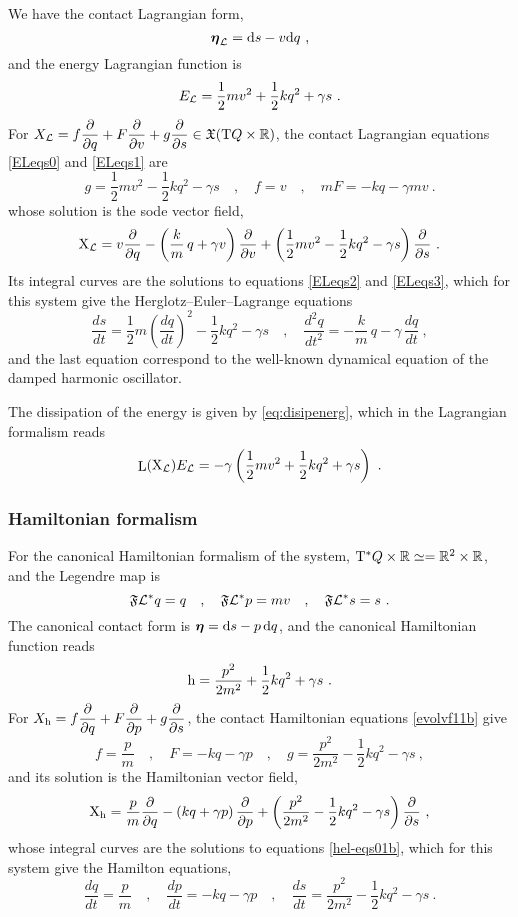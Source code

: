 \documentclass[12pt]{report}
\def\beq{\begin{equation}}
\def\eeq{\end{equation}}
\def\dst{\displaystyle}
\def\derpar#1#2{\frac{\partial{#1}}{\partial{#2}}}
\def\vf{\mathfrak X}
\def\Lag{{\cal L}}
\def\d{{\rm d}}
\def\Real{\mathbb{R}}
\def\bmeta{\mbox{\boldmath $\eta$}}
\def\X{{\rm X}}
\def\Tan{{\rm T}}
\def\Lie{\mathop{\rm L}\nolimits}
\begin{document}
We have the contact Lagrangian form,
$$
\bmeta_\Lag=\d s-v\d q \ ,
$$
and the energy Lagrangian function is
$$ 
E_\Lag = \frac{1}{2}mv^2 + \frac{1}{2}kq^2 + \gamma s \ .
$$
For $\displaystyle X_\Lag=f\derpar{}{q}+F\derpar{}{v}+g\derpar{}{s}\in\vf(\Tan Q\times\Real)$,
the contact Lagrangian equations \eqref{ELeqs0}
and \eqref{ELeqs1} are
$$
g=\frac{1}{2}mv^{2}-\frac{1}{2}kq^{2}-\gamma s \quad , \quad f=v \quad , \quad mF=-kq-\gamma mv \ .
$$
whose solution is the {\sc sode} vector field,
$$
\X_\Lag=v\frac{\partial}{\partial q}-
\left(\frac{k}{m}\,q+\gamma v\right) \frac{\partial}{\partial v}+\left(\frac{1}{2}mv^{2}-\frac{1}{2}kq^{2}-\gamma s\right)\frac{\partial}{\partial s}\ .
$$
Its integral curves are the solutions to equations \eqref{ELeqs2} and \eqref{ELeqs3},
which for this system give the Herglotz--Euler--Lagrange equations
\beq
\label{HELdho}
\frac{ds}{dt}=\frac{1}{2}m\left(\frac{dq}{dt}\right)^2-\frac{1}{2}kq^{2}-\gamma s \quad , \quad
\frac{d^2q}{dt^2}=-\frac{k}{m}\,q-\gamma\,\frac{dq}{dt} \ ,
\eeq
and the last equation correspond to the well-known dynamical equation of the damped harmonic oscillator. 

The dissipation of the energy is given by 
\eqref{eq:disipenerg}, which in the Lagrangian formalism reads
$$
\Lie(\X_\Lag)E_\Lag=-\gamma\left(\frac{1}{2}mv^2 + \frac{1}{2}kq^2 + \gamma s\right)\ .
$$


\subsubsection{Hamiltonian formalism}


For the canonical Hamiltonian formalism of the system, 
$\Tan^*Q\times\Real\simeq=\Real^2\times\Real$,
and the Legendre map is 
$$
\mathfrak{F}\Lag^*q=q  \quad , \quad \mathfrak{F}\Lag^*p=mv  \quad , \quad \mathfrak{F}\Lag^*s=s  \ .
$$
The canonical contact form is $\bmeta=\d s-p\,\d q$, and 
the canonical Hamiltonian function reads
$$ 
{\rm h}=\frac{p^2}{2m^2} + \frac{1}{2}kq^2 + \gamma s \ .
$$
For $\displaystyle X_{\rm h}=f\derpar{}{q}+F\derpar{}{p}+g\derpar{}{s}$,
the contact Hamiltonian equations \eqref{evolvf11b} give
$$
f=\frac{p}{m} \quad , \quad F=-kq-\gamma p \quad , \quad g=\frac{p^2}{2m^2}-\frac{1}{2}kq^2-\gamma s  \ ,
$$
and its solution is the Hamiltonian vector field,
$$
\X_{\rm h}=\frac{p}{m}\frac{\partial}{\partial q}-
\left(kq+\gamma p\right) \frac{\partial}{\partial p}+\left(\frac{p^2}{2m^2}-\frac{1}{2}kq^2-\gamma s\right)\frac{\partial}{\partial s}\ ,
$$
whose integral curves are the solutions to equations \eqref{hel-eqs01b},
which for this system give the Hamilton equations,
\beq
\label{Hdho}
\dst\frac{dq}{dt}=\frac{p}{m}\quad ,\quad
\dst\frac{dp}{dt}=-kq-\gamma p\quad , \quad
\dst\frac{ds}{dt}=\frac{p^2}{2m^2}-\frac{1}{2}kq^2-\gamma s \ .
\eeq
\end{document}
